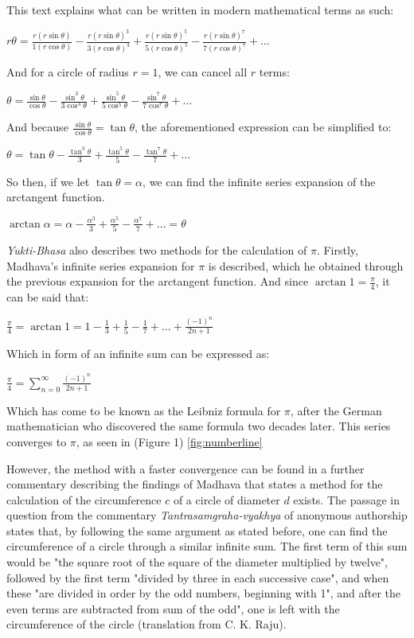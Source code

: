 

This text explains what can be written in modern mathematical terms as such:

$r \theta = \frac{r (r \sin{\theta})}{1 (r \cos{\theta})} - \frac{r (r \sin{\theta})^3}{3 (r \cos{\theta})^3} + \frac{r (r \sin{\theta})^5}{5 (r \cos{\theta})^5} - \frac{r (r \sin{\theta})^7}{7 (r \cos{\theta})^7} + \dots$

And for a circle of radius $r = 1$, we can cancel all $r$ terms:

$\theta = \frac{\sin{\theta}}{\cos{\theta}} - \frac{\sin^3{\theta}}{3 \cos^3{\theta}} + \frac{\sin^5{\theta}}{5 \cos^5{\theta}} - \frac{\sin^7{\theta}}{7 \cos^7{\theta}} + \dots$

And because $\frac{\sin{\theta}}{\cos{\theta}} = \tan{\theta}$, the aforementioned expression 
can be simplified to: 

$\theta = \tan{\theta} - \frac{\tan^3{\theta}}{3} + \frac{\tan^5{\theta}}{5} - \frac{\tan^7{\theta}}{7} + \dots$

So then, if we let $\tan{\theta} = \alpha$, we can find the infinite series expansion 
of the arctangent function. 

$\arctan{\alpha} = \alpha - \frac{\alpha^3}{3} + \frac{\alpha^5}{5} - \frac{\alpha^7}{7} + \dots = \theta$

\textit{Yukti-Bhasa} also describes two methods for the calculation of $\pi$. Firstly, 
Madhava's infinite series expansion for $\pi$ is described, which he obtained through 
the previous expansion for the arctangent function. And since $\arctan{1} = \frac{\pi}{4}$,
it can be said that: 

$\frac{\pi}{4} = \arctan{1} = 1 - \frac{1}{3} + \frac{1}{5} - \frac{1}{7} + \dots + \frac{(-1)^n}{2n +1}$

Which in form of an infinite sum can be expressed as: 

$\frac{\pi}{4} = \sum\limits_{n=0}^\infty \frac{(-1)^n}{2n +1}$

Which has come to be known as the Leibniz formula for $\pi$, after the German mathematician 
who discovered the same formula two decades later. \cite{edwards_1994} This series converges to $\pi$, as seen in (Figure 1) \ref{fig:numberline}


However, the method with a faster convergence can be found in a further commentary describing the findings of Madhava that states  
a method for the calculation of the circumference $c$ of a circle of diameter $d$ exists. 
The passage in question from the commentary \textit{Tantrasamgraha-vyakhya} of 
anonymous authorship states that, by following the same argument as stated before, one 
can find the circumference of a circle through a similar infinite sum. The first 
term of this sum would be "the square root of the square of the diameter multiplied by 
twelve", followed by the first term "divided by three in each successive case", and 
when these "are divided in order by the odd numbers, beginning with 1", and after the 
even terms are subtracted from sum of the odd", one is left with the circumference of the 
circle (translation from C. K. Raju). \cite{raju_2007} 

